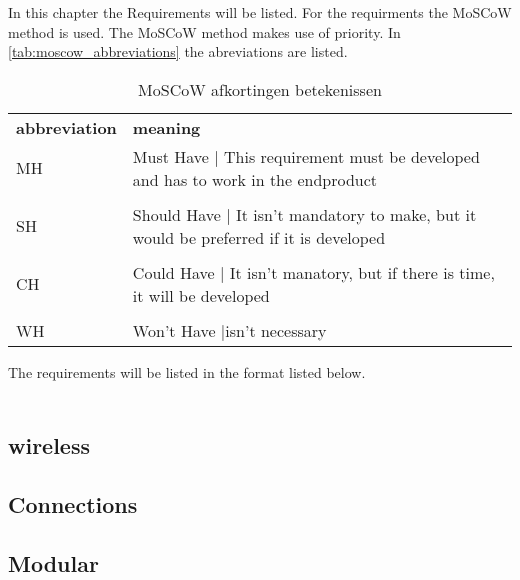 In this chapter the Requirements will be listed. For the requirments the MoSCoW method is used. The MoSCoW method makes use of priority. In \autoref{tab:moscow_abbreviations} the abreviations are listed.

\begin{table}[H]
\centering
    \begin{tabular}{l p{8cm}}
        \textbf{abbreviation} & \textbf{meaning} \\
        MH & Must Have | This requirement must be developed and has to work in the endproduct\\
        & \\
        SH & Should Have | It isn't mandatory to make, but it would be preferred if it is developed\\
        & \\
        CH & Could Have | It isn't manatory, but if there is time, it will be developed\\
        & \\
        WH & Won't Have |isn't necessary\\
    \end{tabular}
    \caption{MoSCoW afkortingen betekenissen}
    \label{tab:moscow_abbreviations}
\end{table}

The requirements will be listed in the format listed below.\\

\\

\subsection{wireless}


\subsection{Connections}


\subsection{Modular}

